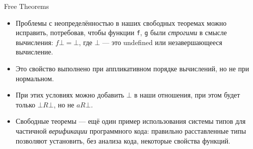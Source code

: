 \documentclass[xcolor=dvipsnames]{beamer}
\begin{document}
\begin{frame}{Free Theorems}
 
 \begin{itemize}[<+->]
  \item Проблемы с неопределённостью в наших свободных теоремах можно исправить, потребовав, чтобы функции {\tt f}, {\tt g} были {\em строгими} в смысле вычисления:
  $f \bot = \bot$, где $\bot$ --- это undefined или незавершающееся вычисление.
  \item Это свойство выполнено при аппликативном порядке вычислений, но не при нормальном.
  \item При этих условиях можно добавить $\bot$ в наши отношения, при этом будет только $\bot R \bot$, но не $a R \bot$.
  \item Свободные теоремы --- ещё один пример использования системы типов для частичной {\em верификации} программного кода: правильно расставленные типы позволяют установить, без анализа кода, некоторые свойства функций.
 \end{itemize}

\end{frame}
\end{document}
